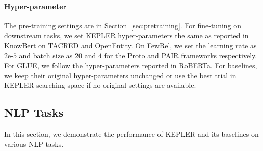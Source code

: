 \paragraph{Hyper-parameter}
The pre-training settings are in Section~\ref{sec:pretraining}. For fine-tuning on downstream tasks, we set KEPLER hyper-parameters the same as reported in KnowBert on TACRED and OpenEntity. On FewRel, we set the learning rate as $2$e-$5$ and batch size as $20$ and $4$ for the Proto and PAIR frameworks respectively. For GLUE, we follow the hyper-parameters reported in RoBERTa. For baselines, we keep their original hyper-parameters unchanged or use the best trial in KEPLER searching space if no original settings are available.

\subsection{NLP Tasks}
\label{sec:nlpexp}
In this section, we demonstrate the performance of KEPLER and its baselines on various NLP tasks. 

